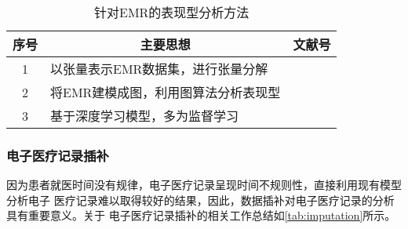 \begin{table}
    \renewcommand\arraystretch{1.5}
    \begin{small}
        \caption{针对EMR的表现型分析方法}
        \label{tab:phenotype}
        \begin{center}
            \begin{tabular}[c]{cll}
                \toprule
                \multicolumn{1}{c}{\textbf{序号}} &
                \multicolumn{1}{c}{\textbf{主要思想}} &
                \multicolumn{1}{c}{\textbf{文献号}}\\
                \midrule
                1 & 以张量表示EMR数据集，进行张量分解 &
                \cite{ho2014extracting} \cite{kim2017federated}
                \cite{perros2018sustain} \cite{heano2018parallel} \cite{he2019distributed}
                \cite{perros2019temporal} \\
                2 & 将EMR建模成图，利用图算法分析表现型 & \cite{liu2015temporal}
                \cite{wang2015graph} \cite{xu2017predicting} \\
                3 & 基于深度学习模型，多为监督学习 & \cite{kale2015causal}
                \cite{che2015deep}
                \cite{beaulieu2016semi} \cite{cheng2016risk}
                \cite{baytas2017patient} \cite{fu2019ddl} \cite{seymour2019derivation} \\
               \bottomrule
            \end{tabular}
        \end{center}
    \end{small}
\end{table}

{}

\subsubsection{电子医疗记录插补}

因为患者就医时间没有规律，电子医疗记录呈现时间不规则性，直接利用现有模型分析电子
医疗记录难以取得较好的结果，因此，数据插补对电子医疗记录的分析具有重要意义。关于
电子医疗记录插补的相关工作总结如\cref{tab:imputation}所示。


